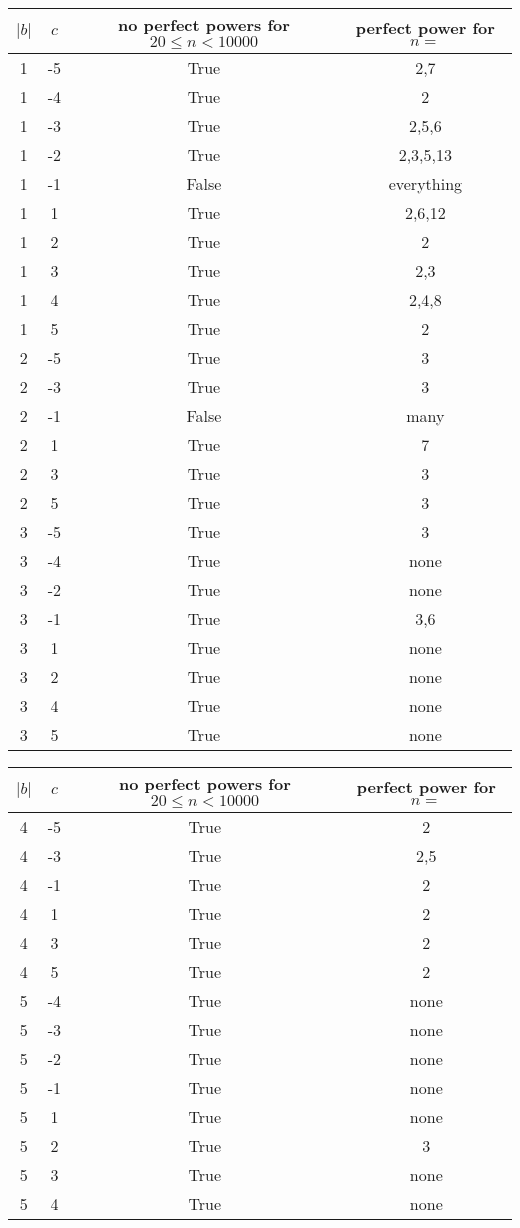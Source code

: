 \documentclass[12pt]{article}
\begin{document}
\begin{center}
\begin{tabular}{c c | c c}
$|b|$ & $c$ & no perfect powers for $20 \leq n < 10000$ & perfect power for $n=$ \\ \hline \hline
1 & -5 & True & 2,7 \\
1 & -4 & True & 2 \\
1 & -3 & True & 2,5,6 \\
1 & -2 & True & 2,3,5,13 \\
1 & -1 & False & everything \\
1 & 1 & True & 2,6,12 \\
1 & 2 & True & 2 \\
1 & 3 & True & 2,3 \\
1 & 4 & True & 2,4,8 \\
1 & 5 & True & 2 \\
2 & -5 & True & 3 \\
2 & -3 & True & 3 \\
2 & -1 & False & many \\
2 & 1 & True & 7 \\
2 & 3 & True & 3 \\
2 & 5 & True & 3 \\ 
3 & -5 & True & 3 \\
3 & -4 & True & none \\
3 & -2 & True & none \\
3 & -1 & True & 3,6 \\
3 & 1 & True & none \\
3 & 2 & True & none \\
3 & 4 & True & none \\
3 & 5 & True & none \\ \hline \hline
\end{tabular}

\begin{tabular}{c c | c c}
$|b|$ & $c$ & no perfect powers for $20 \leq n < 10000$ & perfect power for $n=$ \\ \hline \hline
4 & -5 & True & 2 \\
4 & -3 & True & 2,5 \\
4 & -1 & True & 2 \\
4 & 1 & True & 2 \\
4 & 3 & True & 2 \\
4 & 5 & True & 2 \\
5 & -4 & True & none\\
5 & -3 & True & none\\
5 & -2 & True & none\\
5 & -1 & True & none\\
5 & 1 & True & none\\
5 & 2 & True & 3\\
5 & 3 & True & none\\
5 & 4 & True & none \\ \hline \hline
\end{tabular}
\end{center}
\end{document}
